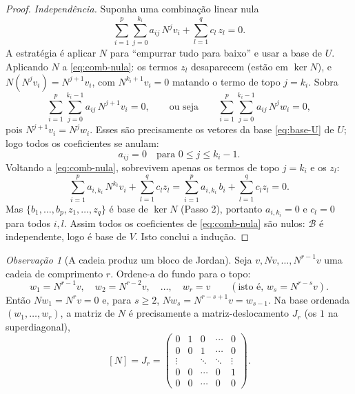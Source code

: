 \documentclass[11pt,a4paper]{amsart}
\theoremstyle{plain}
\theoremstyle{definition}
\theoremstyle{remark}
\newtheorem{observacao}[teorema]{Observação}
\begin{document}
\begin{proof}
\emph{Independ\^encia.} Suponha uma combina\c{c}\~ao linear nula
\begin{equation}\label{eq:comb-nula}
  \sum_{i=1}^{p}\sum_{j=0}^{k_i} a_{ij}\,N^{j}v_i
  + \sum_{l=1}^{q} c_l\,z_l = 0.
\end{equation}
A estrat\'egia \'e aplicar $N$ para ``empurrar tudo para baixo'' e usar a
base de $U$. Aplicando $N$ a \eqref{eq:comb-nula}: os termos $z_l$ desaparecem
(est\~ao em $\ker N$), e $N(N^{j}v_i)=N^{j+1}v_i$, com $N^{k_i+1}v_i=0$
matando o termo de topo $j=k_i$. Sobra
\[
  \sum_{i=1}^{p}\sum_{j=0}^{k_i-1} a_{ij}\,N^{j+1}v_i = 0,
  \qquad\text{ou seja}\qquad
  \sum_{i=1}^{p}\sum_{j=0}^{k_i-1} a_{ij}\,N^{j}w_i = 0,
\]
pois $N^{j+1}v_i=N^{j}w_i$. Esses s\~ao precisamente os vetores da base
\eqref{eq:base-U} de $U$; logo todos os coeficientes se anulam:
\[
  a_{ij}=0 \quad\text{para } 0\le j\le k_i-1 .
\]
Voltando a \eqref{eq:comb-nula}, sobrevivem apenas os termos de topo $j=k_i$
e os $z_l$:
\[
  \sum_{i=1}^{p} a_{i,k_i}\,N^{k_i}v_i + \sum_{l=1}^{q} c_l z_l
  = \sum_{i=1}^{p} a_{i,k_i}\,b_i + \sum_{l=1}^{q} c_l z_l = 0.
\]
Mas $\{b_1,\dots,b_p,z_1,\dots,z_q\}$ \'e base de $\ker N$ (Passo 2), portanto
$a_{i,k_i}=0$ e $c_l=0$ para todos $i,l$. Assim todos os coeficientes de
\eqref{eq:comb-nula} s\~ao nulos: $\mathcal{B}$ \'e independente, logo \'e base
de $V$. Isto conclui a indu\c{c}\~ao.
\end{proof}

\begin{observacao}[A cadeia produz um bloco de Jordan]\label{obs:bloco}
Seja $v,Nv,\dots,N^{r-1}v$ uma cadeia de comprimento $r$. Ordene-a do fundo
para o topo:
\[
  w_1 = N^{r-1}v,\quad w_2 = N^{r-2}v,\quad\dots,\quad w_r = v
  \qquad (\text{isto \'e, } w_s = N^{r-s}v).
\]
Ent\~ao $Nw_1 = N^r v = 0$ e, para $s\ge2$, $Nw_s = N^{r-s+1}v = w_{s-1}$. Na
base ordenada $(w_1,\dots,w_r)$, a matriz de $N$ \'e precisamente a
matriz-deslocamento $J_r$ (os $1$ na superdiagonal),
\[
  [N]
  = J_r
  = \begin{pmatrix}
      0 & 1 & 0 & \cdots & 0\\
      0 & 0 & 1 & \cdots & 0\\
      \vdots & & \ddots & \ddots & \vdots\\
      0 & 0 & \cdots & 0 & 1\\
      0 & 0 & \cdots & 0 & 0
    \end{pmatrix}.
\]
\end{observacao}

\end{document}
